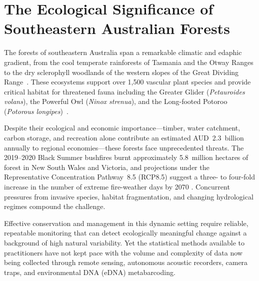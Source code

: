 \section{The Ecological Significance of Southeastern Australian Forests}

The forests of southeastern Australia span a remarkable climatic and edaphic
gradient, from the cool temperate rainforests of Tasmania and the Otway Ranges
to the dry sclerophyll woodlands of the western slopes of the Great Dividing
Range~\cite{keith2014}. These ecosystems support over 1{,}500 vascular plant
species and provide critical habitat for threatened fauna including the
Greater Glider (\textit{Petauroides volans}), the Powerful Owl
(\textit{Ninox strenua}), and the Long-footed Potoroo
(\textit{Potorous longipes})~\cite{bradshaw2012}.

Despite their ecological and economic importance—timber, water catchment,
carbon storage, and recreation alone contribute an estimated AUD~2.3~billion
annually to regional economies—these forests face unprecedented threats.
The 2019--2020 Black Summer bushfires burnt approximately 5.8~million hectares
of forest in New South Wales and Victoria, and projections under the
Representative Concentration Pathway~8.5 (RCP8.5) suggest a three- to
four-fold increase in the number of extreme fire-weather days by 2070
\cite{keith2014}. Concurrent pressures from invasive species, habitat
fragmentation, and changing hydrological regimes compound the challenge.

Effective conservation and management in this dynamic setting require reliable,
repeatable monitoring that can detect ecologically meaningful change against a
background of high natural variability. Yet the statistical methods available
to practitioners have not kept pace with the volume and complexity of data now
being collected through remote sensing, autonomous acoustic recorders, camera
traps, and environmental DNA (eDNA) metabarcoding.
